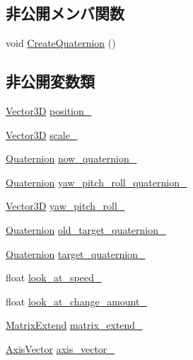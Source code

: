 \subsection*{非公開メンバ関数}
\begin{DoxyCompactItemize}
\item 
void \mbox{\hyperlink{class_transform_a7884cb828ace5c921e7138d83c43d689}{Create\+Quaternion}} ()
\end{DoxyCompactItemize}
\subsection*{非公開変数類}
\begin{DoxyCompactItemize}
\item 
\mbox{\hyperlink{class_vector3_d}{Vector3D}} \mbox{\hyperlink{class_transform_aa36f8a9ae39411699f7ff77f017f618a}{position\+\_\+}}
\item 
\mbox{\hyperlink{class_vector3_d}{Vector3D}} \mbox{\hyperlink{class_transform_ade54d2d37f01b20758b0ce11def76104}{scale\+\_\+}}
\item 
\mbox{\hyperlink{_vector3_d_8h_a3ee38c9c46d9851e33a9a1113328dafc}{Quaternion}} \mbox{\hyperlink{class_transform_a00d46dfb43b1e60b4f6ca8728d6aff54}{now\+\_\+quaternion\+\_\+}}
\item 
\mbox{\hyperlink{_vector3_d_8h_a3ee38c9c46d9851e33a9a1113328dafc}{Quaternion}} \mbox{\hyperlink{class_transform_ac9985a4b70b9af742c9f26f47784ba7b}{yaw\+\_\+pitch\+\_\+roll\+\_\+quaternion\+\_\+}}
\item 
\mbox{\hyperlink{class_vector3_d}{Vector3D}} \mbox{\hyperlink{class_transform_a725d32ecbcf8da99d63bb6296d9cd123}{yaw\+\_\+pitch\+\_\+roll\+\_\+}}
\item 
\mbox{\hyperlink{_vector3_d_8h_a3ee38c9c46d9851e33a9a1113328dafc}{Quaternion}} \mbox{\hyperlink{class_transform_a52fa2db52356033f42908fde94f9cb28}{old\+\_\+target\+\_\+quaternion\+\_\+}}
\item 
\mbox{\hyperlink{_vector3_d_8h_a3ee38c9c46d9851e33a9a1113328dafc}{Quaternion}} \mbox{\hyperlink{class_transform_acb5b22818929f01f4765a39f2da01579}{target\+\_\+quaternion\+\_\+}}
\item 
float \mbox{\hyperlink{class_transform_a762490e0b35915244f767d618bb875b4}{look\+\_\+at\+\_\+speed\+\_\+}}
\item 
float \mbox{\hyperlink{class_transform_acda35632e3895b925eaae4625c564b5f}{look\+\_\+at\+\_\+change\+\_\+amount\+\_\+}}
\item 
\mbox{\hyperlink{class_matrix_extend}{Matrix\+Extend}} \mbox{\hyperlink{class_transform_a150c78be6568eaf017165ff5c90d6928}{matrix\+\_\+extend\+\_\+}}
\item 
\mbox{\hyperlink{class_axis_vector}{Axis\+Vector}} \mbox{\hyperlink{class_transform_a2bde97ec180664c5587c445737c04cbe}{axis\+\_\+vector\+\_\+}}
\end{DoxyCompactItemize}


